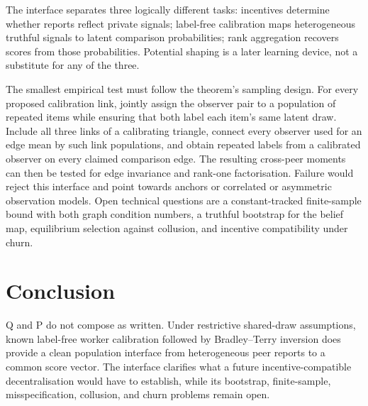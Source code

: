 \documentclass{article}
\begin{document}
The interface separates three logically different tasks: incentives determine whether reports reflect private signals; label-free calibration maps heterogeneous truthful signals to latent comparison probabilities; rank aggregation recovers scores from those probabilities.  Potential shaping is a later learning device, not a substitute for any of the three. %

The smallest empirical test must follow the theorem's sampling design.  For every proposed calibration link, jointly assign the observer pair to a population of repeated items while ensuring that both label each item's same latent draw.  Include all three links of a calibrating triangle, connect every observer used for an edge mean by such link populations, and obtain repeated labels from a calibrated observer on every claimed comparison edge.  The resulting cross-peer moments can then be tested for edge invariance and rank-one factorisation.  Failure would reject this interface and point towards anchors or correlated or asymmetric observation models. %
Open technical questions are a constant-tracked finite-sample bound with both graph condition numbers, a truthful bootstrap for the belief map, equilibrium selection against collusion, and incentive compatibility under churn. %

\section{Conclusion}

Q and P do not compose as written.  Under restrictive shared-draw assumptions, known label-free worker calibration followed by Bradley--Terry inversion does provide a clean population interface from heterogeneous peer reports to a common score vector. %
The interface clarifies what a future incentive-compatible decentralisation would have to establish, while its bootstrap, finite-sample, misspecification, collusion, and churn problems remain open. %
\end{document}
